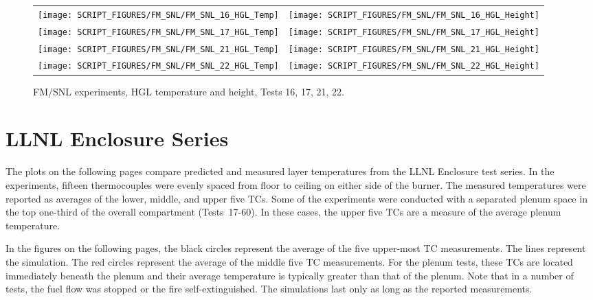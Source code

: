 \begin{figure}[p]
\begin{tabular*}{\textwidth}{l@{\extracolsep{\fill}}r}
\texttt{[image: SCRIPT\_FIGURES/FM\_SNL/FM\_SNL\_16\_HGL\_Temp]} &
\texttt{[image: SCRIPT\_FIGURES/FM\_SNL/FM\_SNL\_16\_HGL\_Height]} \\
\texttt{[image: SCRIPT\_FIGURES/FM\_SNL/FM\_SNL\_17\_HGL\_Temp]} &
\texttt{[image: SCRIPT\_FIGURES/FM\_SNL/FM\_SNL\_17\_HGL\_Height]} \\
\texttt{[image: SCRIPT\_FIGURES/FM\_SNL/FM\_SNL\_21\_HGL\_Temp]} &
\texttt{[image: SCRIPT\_FIGURES/FM\_SNL/FM\_SNL\_21\_HGL\_Height]} \\
\texttt{[image: SCRIPT\_FIGURES/FM\_SNL/FM\_SNL\_22\_HGL\_Temp]} &
\texttt{[image: SCRIPT\_FIGURES/FM\_SNL/FM\_SNL\_22\_HGL\_Height]}
\end{tabular*}
\caption[FM/SNL experiments, HGL temperature and height, Tests 16, 17, 21, 22]
{FM/SNL experiments, HGL temperature and height, Tests 16, 17, 21, 22.}
\label{FM_SNL_HGL_5}
\end{figure}

\clearpage


\section{LLNL Enclosure Series}

The plots on the following pages compare predicted and measured layer temperatures from the LLNL Enclosure test series. In the experiments, fifteen thermocouples were evenly spaced from floor to ceiling on either side of the burner. The measured temperatures were reported as averages of the lower, middle, and upper five TCs. Some of the experiments were conducted with a separated plenum space in the top one-third of the overall compartment (Tests~17-60). In these cases, the upper five TCs are a measure of the average plenum temperature.

In the figures on the following pages, the black circles represent the average of the five upper-most TC measurements. The lines represent the simulation. The red circles represent the average of the middle five TC measurements. For the plenum tests, these TCs are located immediately beneath the plenum and their average temperature is typically greater than that of the plenum. Note that in a number of tests, the fuel flow was stopped or the fire self-extinguished. The simulations last only as long as the reported measurements.

